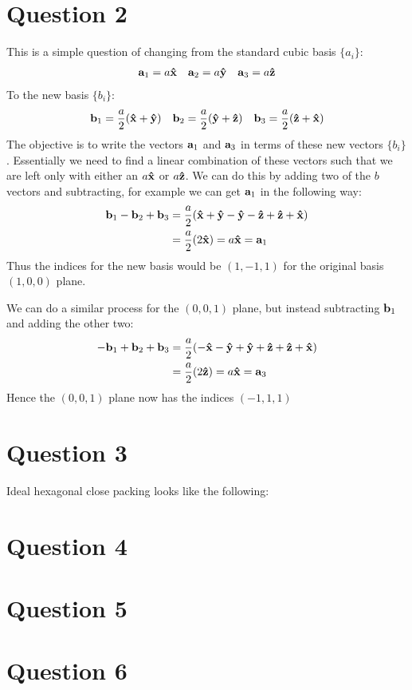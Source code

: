 \documentclass[12pt]{article}
\begin{document}
\section*{Question 2}
This is a simple question of changing from the standard cubic basis $\{a_i\}$:
\begin{align*}
  \vb{a}_1=a\vu{x}\quad\vb{a}_2=a\vu{y}\quad\vb{a}_3=a\vu{z}
\end{align*}
To the new basis $\{b_i\}$:
\begin{align*}
  \vb{b}_1=\frac{a}{2}\qty(\vu{x}+\vu{y})\quad
  \vb{b}_2=\frac{a}{2}\qty(\vu{y}+\vu{z})\quad
  \vb{b}_3=\frac{a}{2}\qty(\vu{z}+\vu{x})
\end{align*}
The objective is to write the vectors $\vb{a}_1$ and $\vb{a}_3$ in terms of these new vectors $\{b_i\}$. Essentially we need to find a linear combination of these vectors such that we are left only with either an $a\vu{x}$ or $a\vu{z}$. We can do this by adding two of the $b$ vectors and subtracting, for example we can get $\vb{a}_1$ in the following way:
\begin{align*}
  \vb{b}_1-\vb{b}_2+\vb{b}_3&=
  \frac{a}{2}\qty(\vu{x}+\vu{y}-\vu{y}-\vu{z}+\vu{z}+\vu{x})\\
  &=\frac{a}{2}\qty(2\vu{x})=a\vu{x}=\vb{a}_1
\end{align*}
Thus the indices for the new basis would be $(1,-1,1)$ for the original basis $(1,0,0)$ plane.

We can do a similar process for the $(0,0,1)$ plane, but instead subtracting $\vb{b}_1$ and adding the other two:
\begin{align*}
  -\vb{b}_1+\vb{b}_2+\vb{b}_3&=
  \frac{a}{2}\qty(-\vu{x}-\vu{y}+\vu{y}+\vu{z}+\vu{z}+\vu{x})\\
  &=\frac{a}{2}\qty(2\vu{z})=a\vu{x}=\vb{a}_3
\end{align*}
Hence the $(0,0,1)$ plane now has the indices $(-1,1,1)$
\section*{Question 3}
Ideal hexagonal close packing looks like the following:
\section*{Question 4}

\section*{Question 5}
\section*{Question 6}
\end{document}
